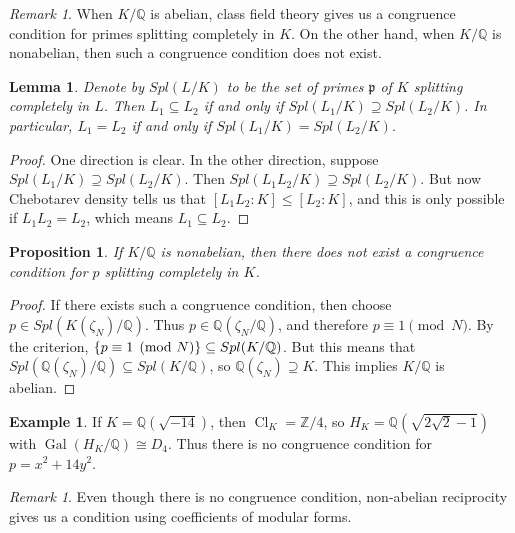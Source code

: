 \documentclass[leqno, openany]{memoir}
\newtheorem{prop}[thm]{Proposition}
\newtheorem{lem}[thm]{Lemma}
\theoremstyle{definition}
\newtheorem{exm}[thm]{Example}
\theoremstyle{remark}
\newtheorem{rmk}[thm]{Remark}
\theoremstyle{plain}
\theoremstyle{definition}
\theoremstyle{remark}
\newcommand{\Z}{\mathbb{Z}}
\newcommand{\Q}{\mathbb{Q}}
\newcommand{\mf}[1]{\mathfrak{#1}}
\DeclareMathOperator{\Gal}{Gal}
\DeclareMathOperator{\Cl}{Cl}
\begin{document}
\begin{rmk}
    When $K/\Q$ is abelian, class field theory gives us a congruence condition for primes splitting completely in $K$. On the other hand, when $K/\Q$ is nonabelian, then such a congruence condition does not exist.
\end{rmk}

\begin{lem}
    Denote by $Spl(L/K)$ to be the set of primes $\mf{p}$ of $K$ splitting completely in $L$. Then $L_1 \subseteq L_2$ if and only if $Spl(L_1/K) \supseteq Spl(L_2/K)$. In particular, $L_1 = L_2$ if and only if $Spl(L_1/K) = Spl(L_2/K)$.
\end{lem}

\begin{proof}
    One direction is clear. In the other direction, suppose $Spl(L_1/K) \supseteq Spl(L_2/K)$. Then $Spl(L_1 L_2/K) \supseteq Spl(L_2/K)$. But now Chebotarev density tells us that $[L_1 L_2:K] \leq [L_2:K]$, and this is only possible if $L_1 L_2 = L_2$, which means $L_1 \subseteq L_2$.
\end{proof}

\begin{prop}
    If $K/\Q$ is nonabelian, then there does not exist a congruence condition for $p$ splitting completely in $K$.
\end{prop}

\begin{proof}
    If there exists such a congruence condition, then choose $p \in Spl(K(\zeta_N)/\Q)$. Thus $p \in \Q(\zeta_N/\Q)$, and therefore $p \equiv 1 \pmod N$. By the criterion, $\qty{p \equiv 1 \pmod N} \subseteq Spl(K/\Q)$. But this means that $Spl(\Q(\zeta_N)/\Q) \subseteq Spl(K/\Q)$, so $\Q(\zeta_N) \supseteq K$. This implies $K/\Q$ is abelian.
\end{proof}

\begin{exm}
    If $K = \Q(\sqrt{-14})$, then $\Cl_K = \Z/4$, so $H_K = \Q(\sqrt{2 \sqrt{2}-1})$ with $\Gal(H_K/\Q) \cong D_4$. Thus there is no congruence condition for $p = x^2 + 14y^2$.
\end{exm}

\begin{rmk}
    Even though there is no congruence condition, non-abelian reciprocity gives us a condition using coefficients of modular forms.
\end{rmk}
\end{document}
